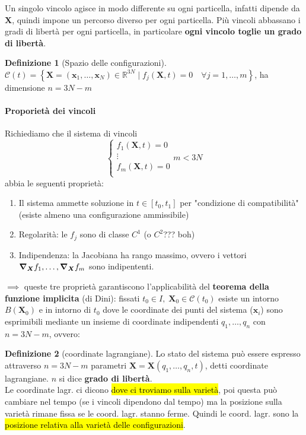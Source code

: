 \documentclass[a4paper,10pt]{article}
\theoremstyle{definition}
\newcommand{\bv}{\boldsymbol} %
\theoremstyle{indentdefinition}
\newtheorem{defn}{Definizione}[section]
\theoremstyle{indenttheorem}
\theoremstyle{myremark}
\theoremstyle{indentgeneral}
\begin{document}
Un singolo vincolo agisce in modo differente su ogni particella, infatti dipende da $\bv{X}$, quindi impone un percorso diverso per ogni particella. Più vincoli abbassano i gradi di libertà per ogni particella, in particolare\textbf{ ogni vincolo toglie un grado di libertà}.

\begin{defn}[Spazio delle configurazioni]
\label{def:varieta}$\mathcal{C}\left(t\right)=\left\{ \boldsymbol{X}=(\bv{x}_1,\dots,\bv{x}_N)\in\mathbb{R}^{3N}\mid f_{j}\left(\boldsymbol{X},t\right)=0\quad\forall j=1,\ldots,m\right\} $,
ha dimensione $n=3N-m$
\end{defn}

\paragraph{Proporietà dei vincoli} Richiediamo che il sistema di vincoli 
$$\begin{cases}
    f_1(\bv{X},t)=0 \\
    \vdots \\
    f_m(\bv{X},t)=0 \\
\end{cases} m<3N$$
abbia le seguenti proprietà:
\begin{enumerate}
    \item Il sistema ammette soluzione in $t\in[t_0,t_1]$ per "condizione di compatibilità" (esiste almeno una configurazione ammissibile)
    \item Regolarità: le $f_j$ sono di classe $C^1$ (o $C^2$??? boh)
    \item Indipendenza: la Jacobiana ha rango massimo, ovvero i vettori $\grad_{\bv{X}}f_1,\dots,\grad_{\bv{X}}f_m$ sono indipententi.
\end{enumerate}
$\implies$ queste tre proprietà garantiscono l'applicabilità del \textbf{teorema della funzione implicita} (di Dini): fissati $t_0\in I,\;\bv{X}_0\in\mathcal{C}(t_0)$ esiste un intorno $B(\bv{X}_0)$  e in intorno di $t_0$ dove le coordinate dei punti del sistema ($\bv{x}_i$) sono esprimibili mediante un insieme di coordinate indipendenti $q_1,\dots,q_n$ con $n=3N-m$, ovvero:

\begin{defn}[coordinate lagrangiane]
\label{def:coordinate-lagrangiane}Lo stato del sistema può essere
espresso attraverso $n=3N-m$ parametri $\boldsymbol{X}=\boldsymbol{X}\left(q_{1},\ldots,q_{n},t\right)$,
detti coordinate lagrangiane. $n$ si dice \textbf{grado di libertà}. \\
Le coordinate lagr. ci dicono \hl{dove ci troviamo sulla varietà}, poi questa può cambiare  nel tempo (se i vincoli dipendono dal tempo) ma  la posizione sulla varietà rimane fissa se le coord. lagr. stanno ferme. Quindi le coord. lagr. sono la \hl{posizione relativa alla varietà delle configurazioni}.
\end{defn}
\end{document}
